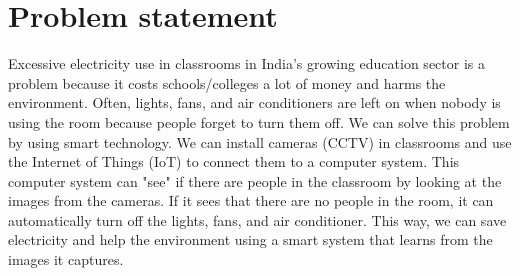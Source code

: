 \documentclass[12pt,a4paper]{report}
\begin{document}
\section*{Problem statement}
Excessive electricity use in classrooms in India's growing education sector is a problem
because it costs schools/colleges a lot of money and harms the environment. Often, lights,
fans, and air conditioners are left on when nobody is using the room because people forget
to turn them off. We can solve this problem by using smart technology. We can install cameras
(CCTV) in classrooms and use the Internet of Things (IoT) to connect them to a computer
system. This computer system can "see" if there are people in the classroom by looking at
the images from the cameras. If it sees that there are no people in the room, it can
automatically turn off the lights, fans, and air conditioner. This way, we can save electricity
and help the environment using a smart system that learns from the images it captures.  
\end{document}
